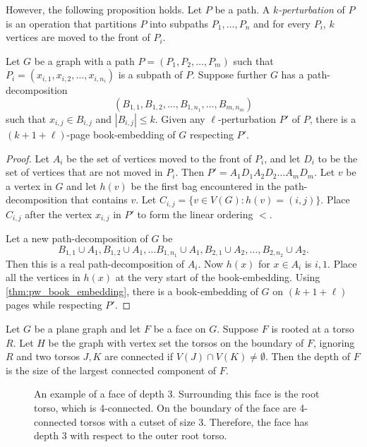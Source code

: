However, the following proposition holds. Let $P$ be a path. A \textit{$k$-perturbation} of $P$ is an operation that partitions $P$ into subpaths $P_1, \ldots, P_n$ and for every $P_i$, $k$ vertices are moved to the front of $P_i$. 

\begin{proposition}\label{prop:k-perturbation}
	Let $G$ be a graph with a path $P = (P_1, P_2, \ldots, P_m)$ such that $P_i = (x_{i,1}, x_{i,2}, \ldots, x_{i, n_{i}})$ is a subpath of $P$. Suppose further $G$ has a path-decomposition \[(B_{1,1}, B_{1,2}, \ldots, B_{1,n_{1}}, \ldots, B_{m, n_{m}})\] such that $x_{i,j} \in B_{i,j}$ and $|B_{i,j}| \leq k$. Given any $\ell$-perturbation $P'$ of $P$, there is a $(k + 1 + \ell)$-page book-embedding of $G$ respecting $P'$.
\end{proposition}

\begin{proof}
	Let $A_i$ be the set of vertices moved to the front of $P_i$, and let $D_i$ to be the set of vertices that are not moved in $P_i$. Then $P' = A_1 D_1 A_2 D_2 \ldots A_m D_m$. 
	Let $v$ be a vertex in $G$ and let $h(v)$ be the first bag encountered in the path-decomposition that contains $v$.
	Let $C_{i,j} = \{v \in V(G): h(v) = (i,j)\}$. Place $C_{i,j}$ after the vertex $x_{i,j}$ in $P'$ to form the linear ordering $<$.

	Let a new path-decomposition of $G$ be \[B_{1,1} \cup A_1, B_{1,2} \cup A_1, \ldots B_{1, n_1} \cup A_1, B_{2,1} \cup A_2, \ldots, B_{2,n_2} \cup A_2.\] Then this is a real path-decomposition of $A_i$. Now $h(x)$ for $x \in A_i$ is ${i, 1}$. Place all the vertices in $h(x)$ at the very start of the book-embedding. Using \cref{thm:pw_book_embedding}, there is a book-embedding of $G$ on $(k + 1 + \ell)$ pages while respecting $P'$. 

\end{proof}

Let $G$ be a plane graph and let $F$ be a face on $G$. Suppose $F$ is rooted at a torso $R$. Let $H$ be the graph with vertex set the torsos on the boundary of $F$, ignoring $R$ and two torsos $J, K$ are connected if $V(J) \cap V(K) \neq \emptyset$. Then the depth of $F$ is the size of the largest connected component of $F$. 
\begin{figure}
	\centering
	
	\caption[Face of depth 3]{An example of a face of depth 3. Surrounding this face is the root torso, which is 4-connected. On the boundary of the face are 4-connected torsos with a cutset of size 3.  Therefore, the face has depth 3 with respect to the outer root torso.}\label{fig:face_depth}
\end{figure}

